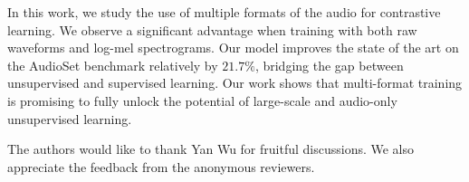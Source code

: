 \documentclass{article}
\begin{document}
In this work, we study the use of multiple formats of the audio for contrastive learning. We observe a significant advantage when training with both raw waveforms and log-mel spectrograms. Our model improves the state of the art on the AudioSet benchmark relatively by $21.7\%$, bridging the gap between unsupervised and supervised learning. Our work shows that multi-format training is promising to fully unlock the potential of large-scale and audio-only unsupervised learning.




































\begin{ack}
The authors would like to thank Yan Wu for fruitful discussions. We also appreciate the feedback from the anonymous reviewers.
\end{ack}









\end{document}
